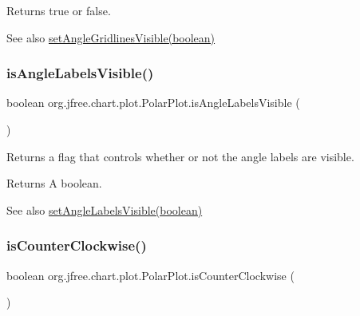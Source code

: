 \begin{DoxyReturn}{Returns}
{\ttfamily true} or {\ttfamily false}.
\end{DoxyReturn}
\begin{DoxySeeAlso}{See also}
\mbox{\hyperlink{classorg_1_1jfree_1_1chart_1_1plot_1_1_polar_plot_aae818235a04355524317e03c5ff60429}{set\+Angle\+Gridlines\+Visible(boolean)}} 
\end{DoxySeeAlso}
\mbox{\label{classorg_1_1jfree_1_1chart_1_1plot_1_1_polar_plot_a065406a06be64510889c2f61ef57da30}} 
\subsubsection{\texorpdfstring{is\+Angle\+Labels\+Visible()}{isAngleLabelsVisible()}}
{\footnotesize\ttfamily boolean org.\+jfree.\+chart.\+plot.\+Polar\+Plot.\+is\+Angle\+Labels\+Visible (\begin{DoxyParamCaption}{ }\end{DoxyParamCaption})}

Returns a flag that controls whether or not the angle labels are visible.

\begin{DoxyReturn}{Returns}
A boolean.
\end{DoxyReturn}
\begin{DoxySeeAlso}{See also}
\mbox{\hyperlink{classorg_1_1jfree_1_1chart_1_1plot_1_1_polar_plot_a8cb293fa3da434fb3ebcbe1ef1ccb435}{set\+Angle\+Labels\+Visible(boolean)}} 
\end{DoxySeeAlso}
\mbox{\label{classorg_1_1jfree_1_1chart_1_1plot_1_1_polar_plot_ad6633efc8529f94a4fcb4a0fc284cf5a}} 
\subsubsection{\texorpdfstring{is\+Counter\+Clockwise()}{isCounterClockwise()}}
{\footnotesize\ttfamily boolean org.\+jfree.\+chart.\+plot.\+Polar\+Plot.\+is\+Counter\+Clockwise (\begin{DoxyParamCaption}{ }\end{DoxyParamCaption})}


